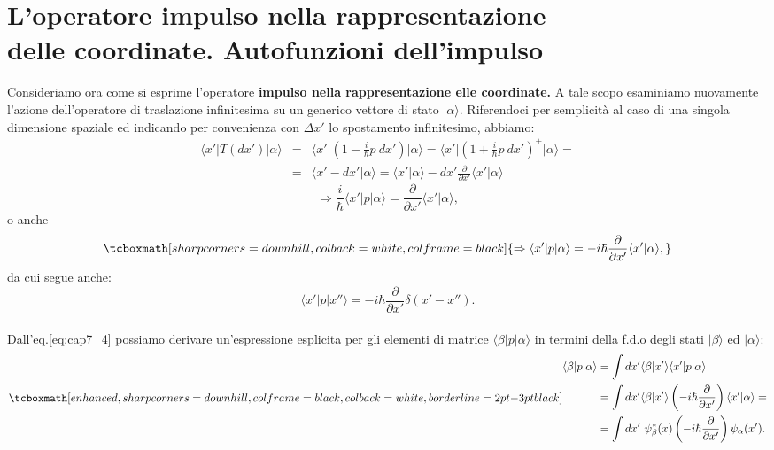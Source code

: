 \documentclass[a4paper,12pt,oneside]{book}
\begin{document}
\section[L'operatore impulso nella rappresentazione delle coordinate. Autofunzioni dell'impulso]{L'operatore impulso nella rappresentazione \\delle coordinate. Autofunzioni dell'impulso}
Consideriamo ora come si esprime l'operatore \textbf{impulso nella rappresentazione elle coordinate.} A tale scopo esaminiamo nuovamente l'azione dell'operatore di traslazione infinitesima su un generico vettore di stato $\vert \alpha \rangle$. Riferendoci per semplicità al caso di una singola dimensione spaziale ed indicando per convenienza con $\Delta x'$ lo spostamento infinitesimo, abbiamo:
	\begin{eqnarray}
		\langle x' \vert T(dx') \vert \alpha \rangle 
		& = & \langle x' \vert \left(1-\frac{i}{\hbar}p\ dx'\right) \vert \alpha \rangle = \langle x' \vert \left(1+\frac{i}{\hbar}p\ dx'\right) ^+ \vert \alpha \rangle = \nonumber \\
		& = & \langle x'-dx'\vert \alpha \rangle = \langle x'\vert \alpha \rangle  - dx' \frac{\partial}{\partial x'} \langle x'\vert \alpha \rangle 
	\end{eqnarray}
	\begin{equation}
		 \Rightarrow \frac{i}{\hbar}\langle x'\vert p \vert \alpha \rangle = \frac{\partial}{\partial x'}\langle x'\vert \alpha \rangle ,
	\end{equation}
o anche
	\begin{equation}
		\label{eq:cap7_4}
		\tcboxmath[sharp corners=downhill, colback=white, colframe=black]{
			\Rightarrow \langle x'\vert p \vert \alpha \rangle =-i\hbar\frac{\partial}{\partial x'}\langle x'\vert \alpha \rangle ,
			}
	\end{equation}
da cui segue anche:
	\begin{equation}
		\langle x'\vert p \vert x'' \rangle =-i\hbar\frac{\partial}{\partial x'}\delta (x'-x'').
	\end{equation}\\
	
Dall'eq.\eqref{eq:cap7_4} possiamo derivare un'espressione esplicita per gli elementi di matrice $\langle \beta \vert p\vert \alpha \rangle $ in termini della f.d.o degli stati $\vert \beta \rangle $ ed $\vert \alpha \rangle $:
	\begin{equation}
		\label{eq:cap7_5}
		\tcboxmath[enhanced, sharp corners=downhill, colframe=black, colback=white, borderline={2pt}{-3pt}{black}]{
		\begin{aligned}
			\langle \beta \vert p \vert \alpha \rangle &= \int dx' \langle \beta \vert x' \rangle \langle x' \vert p \vert \alpha \rangle\\ &= \int dx' 	\langle \beta \vert x' \rangle \left( -i\hbar \frac{\partial}{\partial x'}\right) \langle x' \vert \alpha \rangle = \\
& = \int dx' \ \psi _{\beta} ^* (x) \left( -i\hbar \frac{\partial}{\partial x'}\right) \psi _{\alpha}  (x') .
		\end{aligned}
		}
	\end{equation}\\
	
\end{document}
